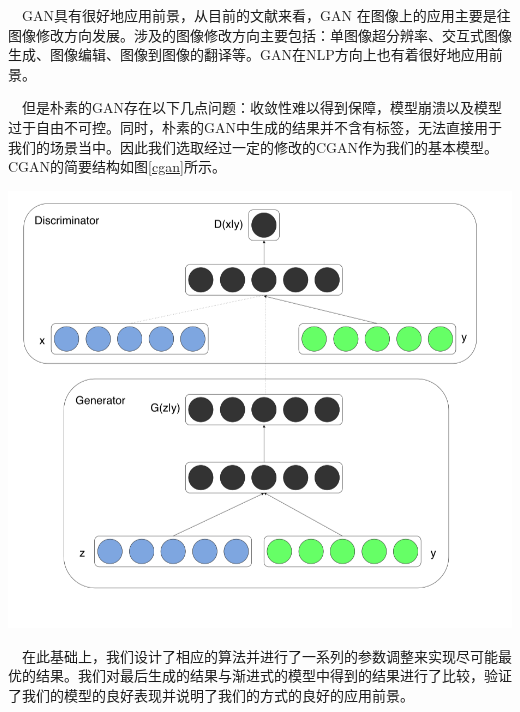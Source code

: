 \documentclass[portrait]{a0poster}
\begin{document}
\begin{multicols}{2}
\begin{CJK}{UTF8}{gbsn}
\ \ GAN具有很好地应用前景，从目前的文献来看，GAN 在图像上的应用主要是往图像修改方向发展。涉及的图像修改方向主要包括：单图像超分辨率、交互式图像生成、图像编辑、图像到图像的翻译等。GAN在NLP方向上也有着很好地应用前景。

\ \ 但是朴素的GAN存在以下几点问题：收敛性难以得到保障，模型崩溃以及模型过于自由不可控。同时，朴素的GAN中生成的结果并不含有标签，无法直接用于我们的场景当中。因此我们选取经过一定的修改的CGAN\supercite{DBLP:journals/corr/MirzaO14}作为我们的基本模型。CGAN的简要结构如图\ref{cgan}所示。

\begin{center}\vspace{1cm}
\includegraphics[width=0.8\linewidth]{CGAN.png}
\label{cgan}
\end{center}\vspace{1cm}

\ \ 在此基础上，我们设计了相应的算法并进行了一系列的参数调整来实现尽可能最优的结果。我们对最后生成的结果与渐进式的模型中得到的结果进行了比较，验证了我们的模型的良好表现并说明了我们的方式的良好的应用前景。

\end{CJK}

\color{DarkSlateGray} %


\end{multicols}
\end{document}
